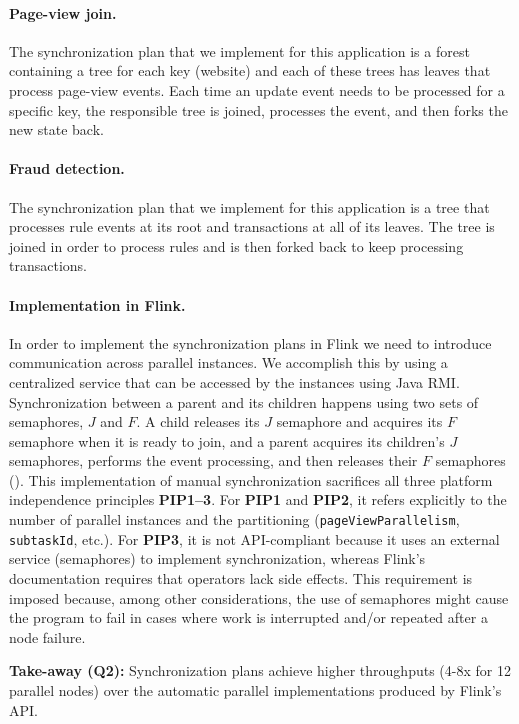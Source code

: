 \paragraph{Page-view join.}
The synchronization plan that we implement for this application is a forest containing a tree for each key (website) and each of these trees has leaves that process page-view events. Each time an update event needs to be processed for a specific key, the responsible tree is joined, processes the event, and then forks the new state back.

\paragraph{Fraud detection.}
The synchronization plan that we implement for this application is a tree that processes rule events at its root and transactions at all of its leaves. The tree is joined in order to process rules and is then forked back to keep processing transactions.

\paragraph{Implementation in Flink.}
In order to implement the synchronization plans in Flink we need to introduce communication across parallel instances. We accomplish this by using a centralized service that can be accessed by the instances using Java RMI. Synchronization between a parent and its children happens using two sets of semaphores, $J$ and $F$.
A child releases its $J$ semaphore and acquires its $F$ semaphore when it is ready to join, and a parent acquires its children's $J$ semaphores, performs the event processing, and then releases their $F$ semaphores ().
This implementation of manual synchronization
sacrifices all three platform independence principles \textbf{PIP1--3}.
For \textbf{PIP1} and \textbf{PIP2}, it refers explicitly to the number of parallel instances and the partitioning (\texttt{pageViewParallelism}, \texttt{subtaskId}, etc.).
For \textbf{PIP3}, it is not API-compliant because it uses an external service (semaphores) to implement synchronization, whereas Flink's documentation requires that operators lack side effects.
This requirement is imposed because, among other considerations, the use of semaphores might cause the program to fail in cases where
work is interrupted and/or repeated after a node failure.

\begin{takeaway}
\textbf{Take-away (Q2):}
Synchronization plans achieve higher throughputs (4-8x for 12 parallel nodes) over the automatic parallel implementations produced by Flink's API.
\end{takeaway}

